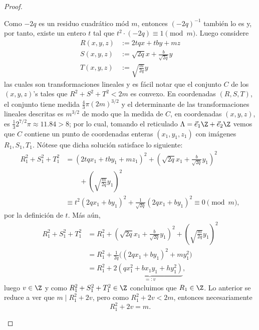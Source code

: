 \documentclass[teoria-numeros.tex]{subfiles}
\begin{document}
\begin{proof}
\begin{enumerate}[(a)]
			Como $-2q$ es un residuo cuadrático mód $m$, entonces $(-2q)^{-1}$ también lo es y, por tanto, existe un entero $t$
			tal que $t^2 \cdot (-2q) \equiv 1 \pmod m$.
			Luego considere
			\begin{align*}
				R(x, y, z) &:= 2tqx + tby + mz \\
				S(x, y, z) &:= \sqrt{2q}x + \frac{b}{\sqrt{2q}}y \\
				T(x, y, z) &:= \sqrt{\frac{m}{2q}} y
			\end{align*}
			las cuales son transformaciones lineales y es fácil notar que el conjunto $C$ de los $(x, y, z)$'s tales que $R^2 + S^2 + T^2 < 2m$
			es convexo.
			En coordenadas $(R, S, T)$, el conjunto tiene medida $\frac{4}{3}\pi(2m)^{3/2}$ y el determinante de las transformaciones lineales
			descritas es $m^{3/2}$ de modo que la medida de $C$, en coordenadas $(x, y, z)$, es $ \frac{1}{3} 2^{7/2}\pi \approx 11.84 > 8$;
			por lo cual, tomando el reticulado $\Lambda = \vec e_1\Z + \vec e_2\Z$ vemos que $C$ contiene un punto de coordenadas enteras
			$(x_1, y_1, z_1)$ con imágenes $R_1, S_1, T_1$.
			Nótese que dicha solución satisface lo siguiente:
			\begin{align*}
				R_1^2 + S_1^2 + T_1^2 &= (2tqx_1 + tby_1 + mz_1)^2 + \left( \sqrt{2q}x_1 + \frac{b}{\sqrt{2q}}y_1 \right)^2 \\
						      &\qquad {} + \left( \sqrt{\frac{m}{2q}} y_1 \right)^2 \\
						      &\equiv t^2(2qx_1 + by_1)^2 + \frac{1}{\sqrt{2q}}(2qx_1 + by_1)^2 \equiv 0 \pmod m,
			\end{align*}
			por la definición de $t$.
			Más aún,
			\begin{align*}
				R_1^2 + S_1^2 + T_1^2 &= R_1^2 + \left( \sqrt{2q}x_1 + \frac{b}{\sqrt{2q}}y_1 \right)^2 + \left( \sqrt{\frac{m}{2q}} y_1 \right)^2 \\
						      &= R_1^2 + \frac{1}{2q}\big( (2qx_1 + by_1)^2 + my_1^2 \big) \\
						      &= R_1^2 + 2 \underbrace{(qx_1^2 + bx_1y_1 + hy_1^2)}_{=: v},
			\end{align*}
			luego $v \in \Z$ y como $R_1^2 + S_1^2 + T_1^2 \in \Z$ concluimos que $R_1 \in \Z$.
			Lo anterior se reduce a ver que $m \mid R_1^2 + 2v$, pero como $R_1^2 + 2v < 2m$, entonces necesariamente
			\begin{equation}
				R_1^2 + 2v = m.
				\label{eq:three_sqr_id}
			\end{equation}


\end{enumerate}
\end{proof}
\end{document}
